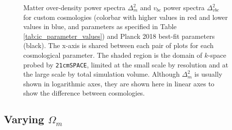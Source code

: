 \documentclass[floats,floatfix,showpacs,amssymb,prd,superscriptaddress,nofootinbib]{revtex4-2} %
\newcommand{\code}{\texttt}
\begin{document}
\begin{figure}[H]
\begin{subfigure}[b]{0.9\textwidth}
     \end{subfigure}
        \caption{Matter over-density power spectra $\Delta_m^2$ and $v_{bc}$ power spectra $\Delta_{vbc}^2$ for custom cosmologies (colorbar with higher values in red and lower values in blue, and parameters as specified in Table \ref{tab:ic_parameter_values}) and Planck 2018 best-fit parameters (black). The x-axis is shared between each pair of plots for each cosmological parameter. The shaded region is the domain of $k$-space probed by \code{21cmSPACE}, limited at the small scale by resolution and at the large scale by total simulation volume. Although $\Delta_m^2$ is usually shown in logarithmic axes, they are shown here in linear axes to show the difference between cosmologies.}
        \label{fig:averaged_IC_power_spectra}
\end{figure}


\subsection{Varying $\Omega_m$}
\end{document}
